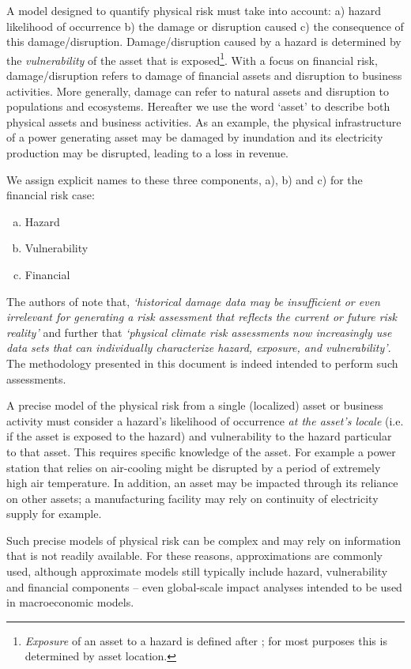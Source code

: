 \documentclass[a4paper,11pt]{extarticle} %
\theoremstyle{definition}
\begin{document}
A model designed to quantify physical risk must take into account: a) hazard likelihood of occurrence  b) the damage or disruption caused c) the consequence of this damage/disruption. Damage/disruption caused by a hazard is determined by the \emph{vulnerability} of the asset that is exposed\footnote{\emph{Exposure} of an asset to a hazard is defined after \cite{MaskreyEtAl:2011}; for most purposes this is determined by asset location.}. With a focus on financial risk, damage/disruption refers to damage of financial assets and disruption to business activities. More generally, damage can refer to natural assets and disruption to populations and ecosystems. Hereafter we use the word `asset' to describe both physical assets and business activities. As an example, the physical infrastructure of a power generating asset may be damaged by inundation and its electricity production may be disrupted, leading to a loss in revenue.

We assign explicit names to these three components, a), b) and c) for the financial risk case:
\begin{enumerate}[a)]
\item Hazard
\item Vulnerability
\item Financial
\end{enumerate}

The authors of \cite{BavandiEtAl:2022} note that, \emph{`historical damage data may be insufficient or even irrelevant for generating a risk assessment that reflects the current or future risk reality'} and further that \emph{`physical climate risk assessments now increasingly use data sets that can individually characterize hazard, exposure, and vulnerability'}. The methodology presented in this document is indeed intended to perform such assessments.

A precise model of the physical risk from a single (localized) asset or business activity must consider a hazard's likelihood of occurrence \emph{at the asset's locale} (i.e. if the asset is exposed to the hazard) and vulnerability to the hazard particular to that asset. This requires specific knowledge of the asset. For example a power station that relies on air-cooling might be disrupted by a period of extremely high air temperature. In addition, an asset may be impacted through its reliance on other assets; a manufacturing facility may rely on continuity of electricity supply for example.

Such precise models of physical risk can be complex and may rely on information that is not readily available. For these reasons, approximations are commonly used, although approximate models still typically include hazard, vulnerability and financial components \cite{BertramEtAl:2020,WoetzelEtAl:2020} -- even global-scale impact analyses intended to be used in macroeconomic models.
\end{document}
